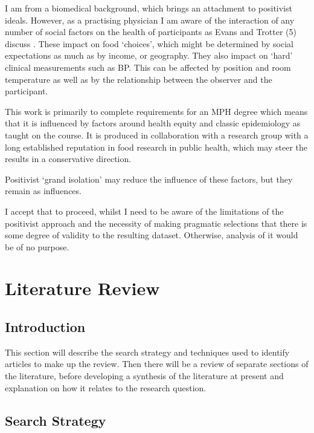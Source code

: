 \documentclass[
]{article}
\begin{document}
I am from a biomedical background, which brings an attachment to
positivist ideals. However, as a practising physician I am aware of the
interaction of any number of social factors on the health of
participants as Evans and Trotter (5) discuss . These impact on food
`choices', which might be determined by social expectations as much as
by income, or geography. They also impact on `hard' clinical
measurements such as BP. This can be affected by position and room
temperature as well as by the relationship between the observer and the
participant.

This work is primarily to complete requirements for an MPH degree which
means that it is influenced by factors around health equity and classic
epidemiology as taught on the course. It is produced in collaboration
with a research group with a long established reputation in food
research in public health, which may steer the results in a conservative
direction.

Positivist `grand isolation' may reduce the influence of these factors,
but they remain as influences.

I accept that to proceed, whilst I need to be aware of the limitations
of the positivist approach and the necessity of making pragmatic
selections that there is some degree of validity to the resulting
dataset. Otherwise, analysis of it would be of no purpose.

\newpage

\hypertarget{literature-review}{%
\section{Literature Review}\label{literature-review}}

\hypertarget{introduction-1}{%
\subsection{Introduction}\label{introduction-1}}

This section will describe the search strategy and techniques used to
identify articles to make up the review. Then there will be a review of
separate sections of the literature, before developing a synthesis of
the literature at present and explanation on how it relates to the
research question.

\hypertarget{search-strategy}{%
\subsection{Search Strategy}\label{search-strategy}}
\end{document}
